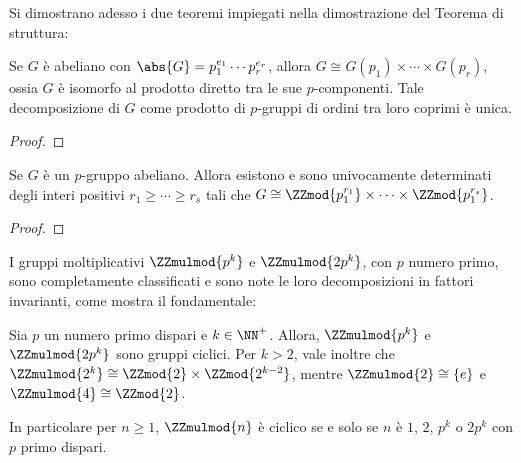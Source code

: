 \documentclass[12pt]{scrartcl}
\begin{document}
	Si dimostrano adesso i due teoremi impiegati nella dimostrazione
	del Teorema di struttura:
	
	\begin{theorem}
		Se $G$ è abeliano con $\abs{G} = p_1^{e_1} \cdots p_r^{e_r}$, allora $G \cong G(p_1) \times \cdots \times G(p_r)$, ossia $G$ è isomorfo al prodotto diretto tra
		le sue $p$-componenti. Tale decomposizione di $G$
		come prodotto di $p$-gruppi di ordini tra loro
		coprimi è unica.
	\end{theorem}
	
	\begin{proof}
	\end{proof}
	
	\begin{theorem}
		Se $G$ è un $p$-gruppo abeliano. Allora esistono
		e sono univocamente determinati degli interi
		positivi $r_1 \geq \cdots \geq r_s$ tali che
		$G \cong \ZZmod{p_1^{r_1}} \times \cdots
		\times \ZZmod{p_1^{r_s}}$.
	\end{theorem}
	
	\begin{proof}
	\end{proof}
	
	I gruppi moltiplicativi $\ZZmulmod{p^k}$ e $\ZZmulmod{2p^k}$,
	con $p$ numero primo, sono completamente classificati e
	sono note le loro decomposizioni in fattori invarianti,
	come mostra il fondamentale:
	
	\begin{theorem}
		Sia $p$ un numero primo dispari e $k \in \NN^+$. Allora,
		$\ZZmulmod{p^k}$ e $\ZZmulmod{2p^k}$ sono gruppi
		ciclici. Per $k > 2$, vale inoltre che
		$\ZZmulmod{2^k} \cong \ZZmod{2} \times \ZZmod{2^{k-2}}$,
		mentre $\ZZmulmod{2} \cong \{e\}$ e $\ZZmulmod{4} \cong
		\ZZmod{2}$. \medskip
		
		
		In particolare per $n \geq 1$, $\ZZmulmod{n}$ è ciclico se e solo se
		$n$ è $1$, $2$, $p^k$ o $2p^k$ con $p$ primo dispari.
	\end{theorem}
	
\end{document}
